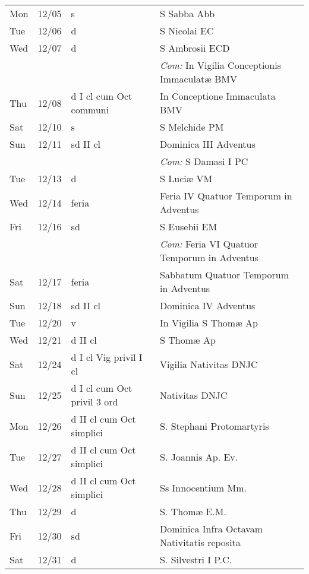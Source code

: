 \documentclass[10pt]{article}
\begin{document}
\begin{longtable}{ l l l l }
Mon & 12/05 & s & S Sabba Abb\\
Tue & 12/06 & d & S Nicolai EC\\
Wed & 12/07 & d & S Ambrosii ECD\\
 & & & \textit{Com:} In Vigilia Conceptionis Immaculatæ BMV\\
Thu & 12/08 & d I cl cum Oct communi & In Conceptione Immaculata BMV\\
Sat & 12/10 & s & S Melchide PM\\
Sun & 12/11 & sd II cl & Dominica III Adventus\\
 & & & \textit{Com:} S Damasi I PC\\
Tue & 12/13 & d & S Luciæ VM\\
Wed & 12/14 & feria & Feria IV Quatuor Temporum in Adventus\\
Fri & 12/16 & sd & S Eusebii EM\\
 & & & \textit{Com:} Feria VI Quatuor Temporum in Adventus\\
Sat & 12/17 & feria & Sabbatum Quatuor Temporum in Adventus\\
Sun & 12/18 & sd II cl & Dominica IV Adventus\\
Tue & 12/20 & v & In Vigilia S Thomæ Ap\\
Wed & 12/21 & d II cl & S Thomæ Ap\\
Sat & 12/24 & d I cl Vig privil I cl & Vigilia Nativitas DNJC\\
Sun & 12/25 & d I cl cum Oct privil 3 ord & Nativitas DNJC\\
Mon & 12/26 & d II cl cum Oct simplici & S. Stephani Protomartyris\\
Tue & 12/27 & d II cl cum Oct simplici & S. Joannis Ap. Ev.\\
Wed & 12/28 & d II cl cum Oct simplici & Ss Innocentium Mm.\\
Thu & 12/29 & d & S. Thomæ E.M.\\
Fri & 12/30 & sd & Dominica Infra Octavam Nativitatis reposita\\
Sat & 12/31 & d & S. Silvestri I P.C.\\
\end{longtable}
\end{document}

